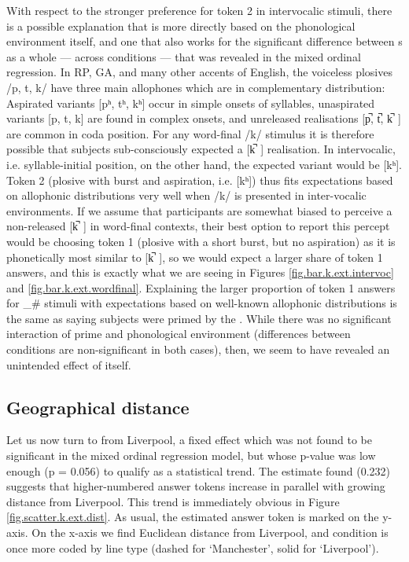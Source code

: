 With respect to the stronger preference for token 2 in intervocalic stimuli, there is a possible explanation that is more directly based on the phonological environment itself, and one that also works for the significant difference between s as a whole --- across  conditions --- that was revealed in the mixed ordinal regression.
In RP, GA, and many other accents of English, the voiceless plosives /p, t, k/ have three main allophones which are in complementary distribution: Aspirated variants [pʰ, tʰ, kʰ] occur in simple onsets of syllables, unaspirated variants [p, t, k] are found in complex onsets, and unreleased realisations [p̚, t̚, k̚~] are common in coda position.
For any word-final /k/ stimulus it is therefore possible that subjects sub-consciously expected a [k̚~] realisation.
In intervocalic, i.e. syllable-initial position, on the other hand, the expected variant would be [kʰ].
Token 2 (plosive with burst and aspiration, i.e. [kʰ]) thus fits expectations based on allophonic distributions very well when /k/ is presented in inter-vocalic environments.
If we assume that participants are somewhat biased to perceive a non-released [k̚~] in word-final contexts, their best option to report this percept would be choosing token 1 (plosive with a short burst, but no aspiration) as it is phonetically most similar to [k̚~], so we would expect a larger share of token 1 answers, and this is exactly what we are seeing in Figures \ref{fig.bar.k.ext.intervoc} and \ref{fig.bar.k.ext.wordfinal}.
Explaining the larger proportion of token 1 answers for \_\# stimuli with expectations based on well-known allophonic distributions is the same as saying subjects were primed by the .
While there was no significant interaction of prime and phonological environment (differences between conditions are non-significant in both cases), then, we seem to have revealed an unintended  effect of  itself.

\subsection{Geographical distance}
\label{sec.perc_res.k.geography}

Let us now turn to  from Liverpool, a fixed effect which was not found to be significant in the mixed ordinal regression model, but whose p-value was low enough (p = 0.056) to qualify as a statistical trend.
The estimate found (0.232) suggests that higher-numbered answer tokens increase in parallel with growing distance from Liverpool.
This trend is immediately obvious in Figure \ref{fig.scatter.k.ext.dist}.
As usual, the estimated answer token is marked on the y-axis.
On the x-axis we find Euclidean distance from Liverpool, and  condition is once more coded by line type (dashed for `Manchester', solid for `Liverpool').

